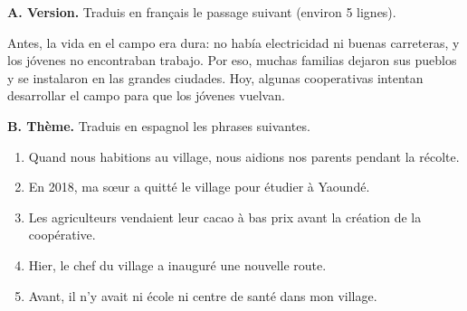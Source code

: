 \documentclass[11pt]{article}
\begin{document}
\begin{exercice}
\textbf{A. Version.} Traduis en français le passage suivant (environ 5 lignes).

\begin{textebox}
Antes, la vida en el campo era dura: no había electricidad ni buenas carreteras, y los jóvenes no encontraban trabajo. Por eso, muchas familias dejaron sus pueblos y se instalaron en las grandes ciudades. Hoy, algunas cooperativas intentan desarrollar el campo para que los jóvenes vuelvan.
\end{textebox}

\textbf{B. Thème.} Traduis en espagnol les phrases suivantes.
\begin{enumerate}
\item Quand nous habitions au village, nous aidions nos parents pendant la récolte.
\item En 2018, ma sœur a quitté le village pour étudier à Yaoundé.
\item Les agriculteurs vendaient leur cacao à bas prix avant la création de la coopérative.
\item Hier, le chef du village a inauguré une nouvelle route.
\item Avant, il n'y avait ni école ni centre de santé dans mon village.
\end{enumerate}
\end{exercice}
\end{document}
